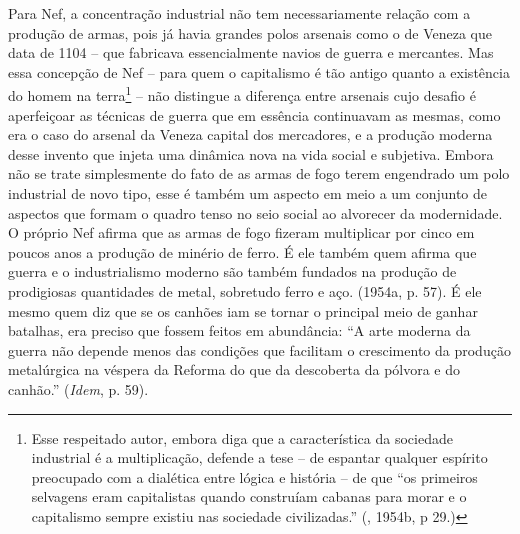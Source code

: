 Para Nef, a concentração industrial não tem necessariamente relação com
a produção de armas, pois já havia grandes polos arsenais como o de
Veneza que data de 1104 -- que fabricava essencialmente navios de guerra
e mercantes. Mas essa concepção de Nef -- para quem o capitalismo é tão
antigo quanto a existência do homem na terra\footnote{Esse respeitado
  autor, embora diga que a característica da sociedade industrial é a
  multiplicação, defende a tese -- de espantar qualquer espírito
  preocupado com a dialética entre lógica e história -- de que ``os
  primeiros selvagens eram capitalistas quando construíam cabanas para
  morar e o capitalismo sempre existiu nas sociedade civilizadas.''
  (, 1954b, p 29.)} -- não distingue a diferença entre arsenais cujo
desafio é aperfeiçoar as técnicas de guerra que em essência continuavam
as mesmas, como era o caso do arsenal da Veneza capital dos mercadores,
e a produção moderna desse invento que injeta uma dinâmica nova na vida
social e subjetiva. Embora não se trate simplesmente do fato de as armas
de fogo terem engendrado um polo industrial de novo tipo, esse é também
um aspecto em meio a um conjunto de aspectos que formam o quadro tenso
no seio social ao alvorecer da modernidade. O próprio Nef afirma que as
armas de fogo fizeram multiplicar por cinco em poucos anos a produção de
minério de ferro. É ele também quem afirma que guerra e o industrialismo
moderno são também fundados na produção de prodigiosas quantidades de
metal, sobretudo ferro e aço. (1954a, p. 57). É ele mesmo quem diz que
se os canhões iam se tornar o principal meio de ganhar batalhas, era
preciso que fossem feitos em abundância: ``A arte moderna da guerra não
depende menos das condições que facilitam o crescimento da produção
metalúrgica na véspera da Reforma do que da descoberta da pólvora e do
canhão.'' (\emph{Idem}, p. 59).

